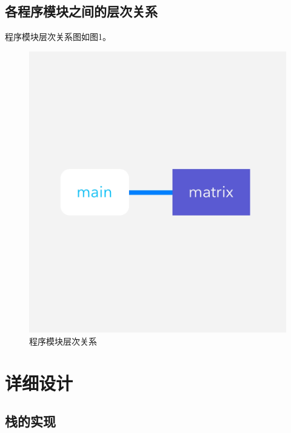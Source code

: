 \documentclass{article}
\begin{document}
\subsection{各程序模块之间的层次关系}

程序模块层次关系图如图1。

\begin{figure}[htbp]

    \centering\includegraphics[width=1\textwidth]{./Images/pic3_1.png}

    \caption{程序模块层次关系}

\end{figure}

\section{详细设计}

\subsection{栈的实现}
\end{document}
